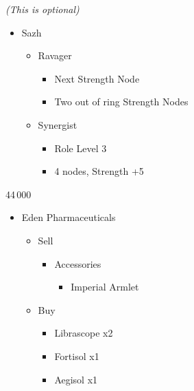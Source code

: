 \begin{menu}
\begin{itemize}
    \crystarium \textit{(This is optional)}
    \begin{itemize}
        \item Sazh
        \begin{itemize}
            \item Ravager
            \begin{itemize}
                \item Next Strength Node
                \item Two out of ring Strength Nodes
            \end{itemize}
            \item Synergist
            \begin{itemize}
                \item Role Level 3
                \item 4 nodes, Strength +5
            \end{itemize}
        \end{itemize}
    \end{itemize}
\end{itemize}
\end{menu}
\begin{shop}{44\,000}
\begin{itemize}
    \item Eden Pharmaceuticals
    \begin{itemize}
        \item Sell
        \begin{itemize}
            \item Accessories
            \begin{itemize}
                \item Imperial Armlet
            \end{itemize}
        \end{itemize}
        \item Buy
        \begin{itemize}
            \item Librascope x2
            \item Fortisol x1
            \item Aegisol x1
        \end{itemize}
    \end{itemize}
\end{itemize}
\end{shop}

